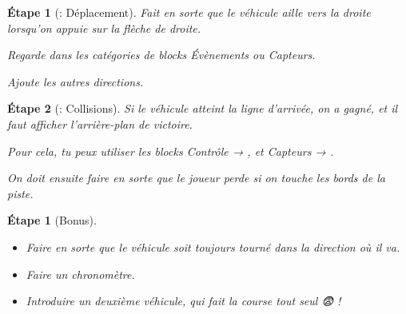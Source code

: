 \documentclass[a4paper,11pt]{article}
\theoremstyle{etape_style}
\newtheorem{etape}{Étape}
\newtheorem*{etape*}{Étape}
\begin{document}
\begin{etape}[: Déplacement]
	Fait en sorte que le véhicule aille vers la droite lorsqu'on appuie sur la flèche de droite.

	\begin{indice}
		Regarde dans les catégories de blocks \textit{Évènements} ou \textit{Capteurs}.
	\end{indice}

	Ajoute les autres directions.
\end{etape}

\begin{etape}[: Collisions]
	Si le véhicule atteint la ligne d'arrivée, on a gagné, et il faut afficher l'arrière-plan de victoire.

	Pour cela, tu peux utiliser les blocks \textit{Contrôle} → , et \textit{Capteurs} → . \vspace{1em}

	On doit ensuite faire en sorte que le joueur perde si on touche les bords de la piste.
\end{etape}

\begin{etape*}[Bonus]\

	\begin{itemize}
		\item Faire en sorte que le véhicule soit toujours tourné dans la direction où il va.
		\item Faire un chronomètre.
		\item Introduire un deuxième véhicule, qui fait la course tout seul 😨 !
	\end{itemize}
\end{etape*}
\end{document}
